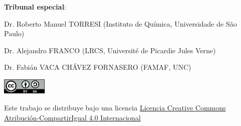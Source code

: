 \textbf{Tribunal especial}:

\hspace{1.5cm} Dr. Roberto Manuel TORRESI (Instituto de Química, Universidade de São Paulo)

\hspace{1.5cm} Dr. Alejandro FRANCO (LRCS, Université de Picardie Jules Verne)

\hspace{1.5cm} Dr. Fabián VACA CHÁVEZ FORNASERO (FAMAF, UNC)

\begin{center}
    
    \vfill
    \href{https://creativecommons.org/licenses/by-sa/4.0/deed.es}{
        \includegraphics[height=0.75cm]{Caratula/cc-by-sa.png}
    }

    {\footnotesize 
    Este trabajo se distribuye bajo una licencia
    \href{https://creativecommons.org/licenses/by-sa/4.0/deed.es}{Licencia 
    Creative Commons Atribución-CompartirIgual 4.0 Internacional}
    }

\end{center}

\singlespacing
